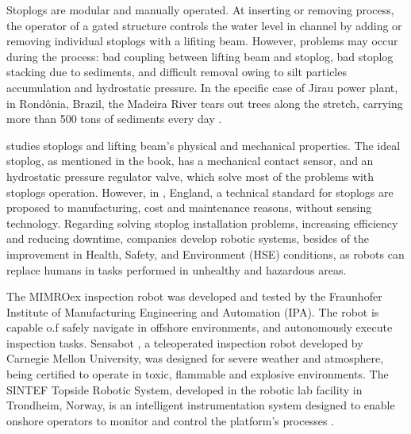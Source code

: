 Stoplogs are modular and manually operated. At inserting or removing process,
the operator of a gated structure controls the water
level in channel by adding or removing individual stoplogs with a lifiting beam.
However, problems may occur during the process: bad coupling between lifting
beam and stoplog, bad stoplog stacking due to sediments, and difficult removal
owing to silt particles accumulation and hydrostatic pressure. In the specific
case of Jirau power plant, in Rond{\^o}nia, Brazil, the Madeira River tears out
trees along the stretch, carrying more than 500 tons of sediments every day
\citep{amazon}.

\citet{jack} studies stoplogs and lifting beam's physical and
mechanical properties. The ideal stoplog, as mentioned in the book, has a
mechanical contact sensor, and an hydrostatic pressure regulator valve, which
solve most of the problems with stoplogs operation. However, in \cite{pinc},
England, a technical standard for stoplogs are proposed to manufacturing,
cost and maintenance reasons, without sensing technology. Regarding solving
stoplog installation problems, increasing efficiency and reducing downtime,
companies develop robotic systems, besides of the improvement in Health,
Safety, and Environment (HSE) conditions, as robots can replace humans in tasks
performed in unhealthy and hazardous areas.



The MIMROex inspection robot  was developed and
tested by the Fraunhofer Institute of Manufacturing Engineering and Automation
(IPA). The robot is capable o.f safely navigate in offshore environments, and
autonomously execute inspection tasks. Sensabot , a
teleoperated inspection robot developed by Carnegie Mellon University, was
designed for severe weather and atmosphere, being certified to operate in toxic, flammable and explosive environments. The SINTEF Topside Robotic System, developed in the robotic lab facility in
Trondheim, Norway, is an intelligent instrumentation system designed to enable onshore operators
to monitor and control the platform's processes .



